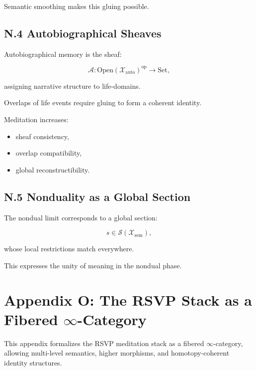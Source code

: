 \documentclass[12pt]{article}
\begin{document}
Semantic smoothing makes this gluing possible.

\subsection*{N.4 Autobiographical Sheaves}

Autobiographical memory is the sheaf:

\[
\mathcal{A}: \mathrm{Open}(\mathcal{X}_{\text{auto}})^{\mathrm{op}} \to \mathrm{Set},
\]

assigning narrative structure to life-domains.

Overlaps of life events require gluing to form a coherent identity.

Meditation increases:

\begin{itemize}
    \item sheaf consistency,
    \item overlap compatibility,
    \item global reconstructibility.
\end{itemize}

\subsection*{N.5 Nonduality as a Global Section}

The nondual limit corresponds to a global section:

\[
s \in \mathcal{S}(\mathcal{X}_{\text{sem}}),
\]

whose local restrictions match everywhere.

This expresses the unity of meaning in the nondual phase.


\section*{Appendix O: The RSVP Stack as a Fibered \texorpdfstring{$\infty$}{∞}-Category}

This appendix formalizes the RSVP meditation stack as a fibered
$\infty$-category, allowing multi-level semantics, higher morphisms, and 
homotopy-coherent identity structures.
\end{document}
